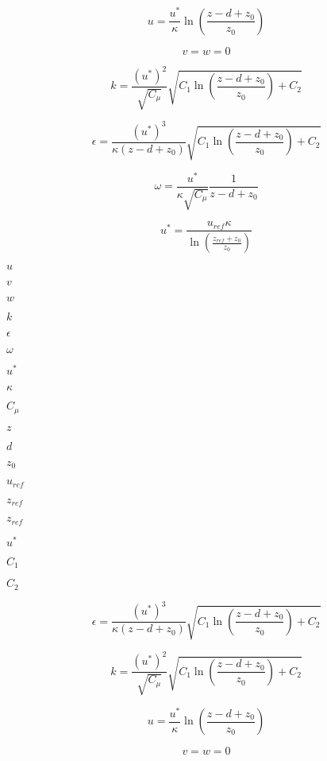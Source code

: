 \documentclass{article}
\begin{document}
\[
    u = \frac{u^*}{\kappa} \ln \left( \frac{z - d + z_0}{z_0} \right)
\]
\pagebreak

\[
    v = w = 0
\]
\pagebreak

\[
    k = \frac{(u^*)^2}{\sqrt{C_\mu}}
    \sqrt{C_1 \ln \left( \frac{z - d + z_0}{z_0} \right) + C_2}
\]
\pagebreak

\[
    \epsilon = \frac{(u^*)^3}{\kappa (z - d + z_0)}
    \sqrt{C_1 \ln \left( \frac{z - d + z_0}{z_0} \right) + C_2}
\]
\pagebreak

\[
    \omega = \frac{u^*}{\kappa \sqrt{C_\mu}} \frac{1}{z - d + z_0}
\]
\pagebreak

\[
    u^* =
        \frac{u_{ref} \kappa}{\ln\left(\frac{z_{ref} + z_0}{z_0}\right)}
\]
\pagebreak

$      u        $
\pagebreak

$      v        $
\pagebreak

$      w        $
\pagebreak

$      k        $
\pagebreak

$      \epsilon $
\pagebreak

$      \omega   $
\pagebreak

$      u^*      $
\pagebreak

$      \kappa   $
\pagebreak

$      C_\mu    $
\pagebreak

$      z        $
\pagebreak

$      d        $
\pagebreak

$      z_0      $
\pagebreak

$      u_{ref}  $
\pagebreak

$z_{ref}$
\pagebreak

$      z_{ref}  $
\pagebreak

$u^*$
\pagebreak

$      C_1      $
\pagebreak

$      C_2      $
\pagebreak

\[
        \epsilon = \frac{(u^*)^3}{\kappa (z - d + z_0)}
        \sqrt{C_1 \ln \left( \frac{z - d + z_0}{z_0} \right) + C_2}
    \]
\pagebreak

\[
        k = \frac{(u^*)^2}{\sqrt{C_\mu}}
        \sqrt{C_1 \ln \left( \frac{z - d + z_0}{z_0} \right) + C_2}
    \]
\pagebreak

\[
        u = \frac{u^*}{\kappa} \ln \left( \frac{z - d + z_0}{z_0} \right)
    \]
\pagebreak

\[
        v = w = 0
    \]
\pagebreak
\end{document}
